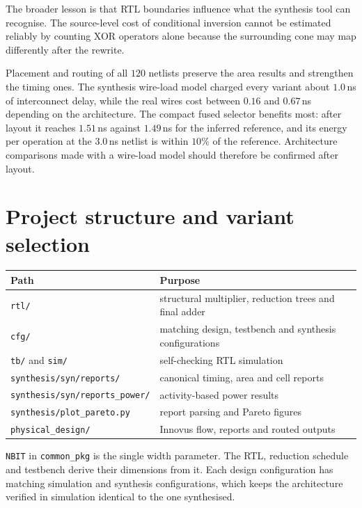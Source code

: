 \documentclass[11pt,a4paper]{article}
\begin{document}
The broader lesson is that RTL boundaries influence what the synthesis tool can
recognise. The source-level cost of conditional inversion cannot be estimated
reliably by counting XOR operators alone because the surrounding cone may map
differently after the rewrite.

Placement and routing of all $120$ netlists preserve the area results and
strengthen the timing ones. The synthesis wire-load model charged every
variant about $1.0$\,ns of interconnect delay, while the real wires cost
between $0.16$ and $0.67$\,ns depending on the architecture. The compact
fused selector benefits most: after layout it reaches $1.51$\,ns against
$1.49$\,ns for the inferred reference, and its energy per operation at the
$3.0$\,ns netlist is within $10\%$ of the reference. Architecture comparisons
made with a wire-load model should therefore be confirmed after layout.

\clearpage
\appendix

\section{Project structure and variant selection}
\label{app:code}

\begin{table}[!ht]
\centering\small
\begin{tabular}{@{}p{}p{}@{}}
\toprule
\textbf{Path} & \textbf{Purpose} \\
\midrule
\texttt{rtl/} & structural multiplier, reduction trees and final adder \\
\texttt{cfg/} & matching design, testbench and synthesis configurations \\
\texttt{tb/} and \texttt{sim/} & self-checking RTL simulation \\
\texttt{synthesis/syn/reports/} & canonical timing, area and cell reports \\
\texttt{synthesis/syn/reports\_power/} & activity-based power results \\
\texttt{synthesis/plot\_pareto.py} & report parsing and Pareto figures \\
\texttt{physical\_design/} & Innovus flow, reports and routed outputs \\
\bottomrule
\end{tabular}
\end{table}

\texttt{NBIT} in \texttt{common\_pkg} is the single width parameter. The RTL,
reduction schedule and testbench derive their dimensions from it. Each design
configuration has matching simulation and synthesis configurations, which keeps
the architecture verified in simulation identical to the one synthesised.
\end{document}
